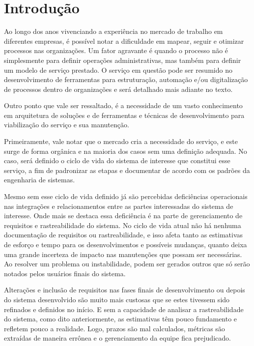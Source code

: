 
\chapter{Introdução}\label{chap:introducao} %

	Ao longo dos anos vivenciando a experiência no mercado de trabalho em diferentes 
	empresas, é possível notar a dificuldade em mapear, seguir e otimizar processos 
	nas organizações. Um fator agravante é quando o processo não é simplesmente 
	para definir operações administrativas, mas também para definir um modelo de 
	serviço prestado. O serviço em questão pode ser resumido no desenvolvimento de 
	ferramentas para estruturação, automação e/ou digitalização de processos dentro 
	de organizações e será detalhado mais adiante no texto.

	Outro ponto que vale ser ressaltado, é a necessidade de um vasto conhecimento 
	em arquitetura de soluções e de ferramentas e técnicas de desenvolvimento para 
	viabilização do serviço e sua manutenção. 

	Primeiramente, vale notar que o mercado cria a necessidade do serviço, e este 
	surge de forma orgânica e na maioria dos casos sem uma definição adequada. No 
	caso, será definido o ciclo de vida do sistema de interesse que constitui esse 
	serviço, a fim de padronizar as etapas e documentar de acordo com os padrões da 
	engenharia de sistemas. 

	Mesmo sem esse ciclo de vida definido já são percebidas deficiências operacionais 
	nas integrações e relacionamentos entre as partes interessadas do sistema de 
	interesse. Onde mais se destaca essa deficiência é na parte de 
	gerenciamento de requisitos e rastreabilidade do sistema. No ciclo de vida atual 
	não há nenhuma documentação de requisitos ou rastreabilidade, e isso afeta tanto 
	as estimativas de esforço e tempo para os desenvolvimentos e possíveis mudanças, 
	quanto deixa uma grande incerteza de impacto nas manutenções que possam ser 
	necessárias. Ao resolver um problema ou instabilidade, podem ser gerados outros 
	que só serão notados pelos usuários finais do sistema. 

	Alterações e inclusão de requisitos nas fases finais de desenvolvimento ou depois 
	do sistema desenvolvido são muito mais custosas que se estes tivessem sido 
	refinados e definidos no início. E sem a capacidade de analisar a rastreabilidade do 
	sistema, como dito anteriormente, as estimativas têm pouco fundamento e 
	refletem pouco a realidade. Logo, prazos são mal calculados, métricas são extraídas 
	de maneira errônea e o gerenciamento da equipe fica prejudicado. 

